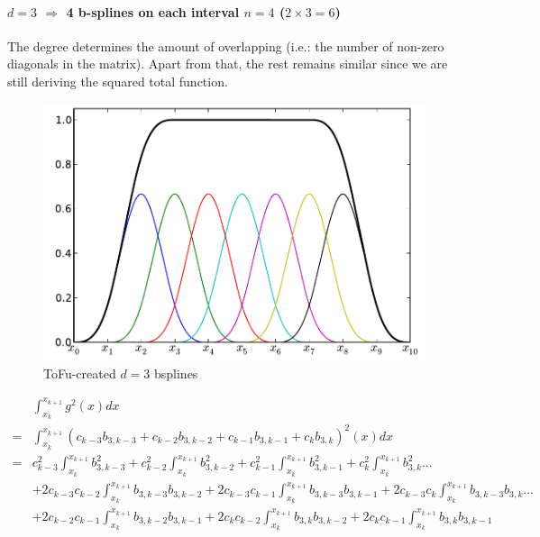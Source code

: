 \documentclass[paper=a4, fontsize=11pt]{scrartcl}
\numberwithin{equation}{section}		%
\numberwithin{figure}{section}			%
\numberwithin{table}{section}				%
\begin{document}
\begin{landscape}
\newpage
\paragraph{\textbf{$d=3$ $\Rightarrow$ 4 b-splines on each interval $n=4$ ($2\times3=6$)}}

The degree determines the amount of overlapping (i.e.: the number of non-zero diagonals in the matrix).
Apart from that, the rest remains similar since we are still deriving the squared total function.

\begin{figure}
  \vspace{-20pt}
  \begin{center}
    \includegraphics[scale=0.4]{Fig02_BSplines_Int_D3.pdf}
  \end{center}
  \vspace{-20pt}
  \caption{\footnotesize ToFu-created $d=3$ bsplines}
  \vspace{-10pt}
\end{figure}

$$
\begin{array}{lll}
& \int_{x_k}^{x_{k+1}} g^2(x)dx\\
= & \int_{x_k}^{x_{k+1}} \left( c_{k-3}b_{3,k-3} + c_{k-2}b_{3,k-2} + c_{k-1}b_{3,k-1} + c_{k}b_{3,k} \right)^2(x)dx\\
= & c_{k-3}^2\int_{x_k}^{x_{k+1}}b_{3,k-3}^2 + c_{k-2}^2\int_{x_k}^{x_{k+1}}b_{3,k-2}^2 + c_{k-1}^2\int_{x_k}^{x_{k+1}}b_{3,k-1}^2 + c_{k}^2\int_{x_k}^{x_{k+1}}b_{3,k}^2 ...\\
  & + 2c_{k-3}c_{k-2}\int_{x_k}^{x_{k+1}}b_{3,k-3}b_{3,k-2} + 2c_{k-3}c_{k-1}\int_{x_k}^{x_{k+1}}b_{3,k-3}b_{3,k-1} + 2c_{k-3}c_{k}\int_{x_k}^{x_{k+1}}b_{3,k-3}b_{3,k} ...\\
  & + 2c_{k-2}c_{k-1}\int_{x_k}^{x_{k+1}}b_{3,k-2}b_{3,k-1} + 2c_{k}c_{k-2}\int_{x_k}^{x_{k+1}}b_{3,k}b_{3,k-2} + 2c_{k}c_{k-1}\int_{x_k}^{x_{k+1}}b_{3,k}b_{3,k-1}
\end{array}
$$


\end{landscape}
\end{document}
